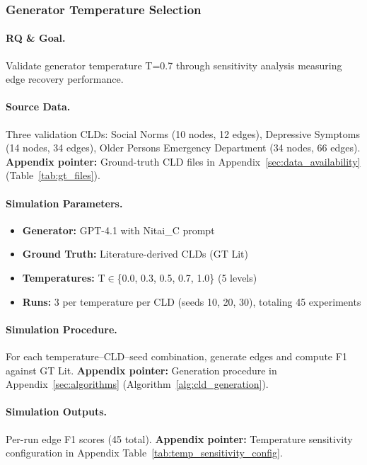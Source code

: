 \subsubsection{Generator Temperature Selection}

\paragraph{RQ \& Goal.}
Validate generator temperature T=0.7 through sensitivity analysis measuring edge recovery performance.

\paragraph{Source Data.}
Three validation CLDs: Social Norms (10 nodes, 12 edges), Depressive Symptoms (14 nodes, 34 edges), Older Persons Emergency Department (34 nodes, 66 edges).
\textbf{Appendix pointer:} Ground-truth CLD files in Appendix~\ref{sec:data_availability} (Table~\ref{tab:gt_files}).

\paragraph{Simulation Parameters.}
\begin{itemize}[noitemsep]
    \item \textbf{Generator:} GPT-4.1 with Nitai\_C prompt
    \item \textbf{Ground Truth:} Literature-derived CLDs (GT Lit)
    \item \textbf{Temperatures:} T$\in$\{0.0, 0.3, 0.5, 0.7, 1.0\} (5 levels)
    \item \textbf{Runs:} 3 per temperature per CLD (seeds 10, 20, 30), totaling 45 experiments
\end{itemize}

\paragraph{Simulation Procedure.}
For each temperature--CLD--seed combination, generate edges and compute F1 against GT Lit.
\textbf{Appendix pointer:} Generation procedure in Appendix~\ref{sec:algorithms} (Algorithm~\ref{alg:cld_generation}).

\paragraph{Simulation Outputs.}
Per-run edge F1 scores (45 total).
\textbf{Appendix pointer:} Temperature sensitivity configuration in Appendix Table~\ref{tab:temp_sensitivity_config}.

